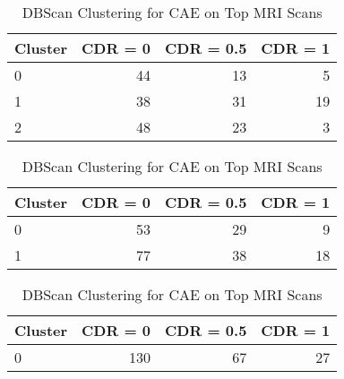 \begin{table}[h] \centering
\begin{minipage}{0.3\textwidth}

\begin{tabular}{lrrr}
\toprule
Cluster & CDR = 0 & CDR = 0.5 & CDR = 1\\
\midrule
0 & 44 & 13 & 5\\
1 & 38 & 31 & 19\\
2 & 48 & 23 & 3\\
\bottomrule
\end{tabular}
\caption{Kmeans Clustering with 3 Clusters for CAE on Top MRI Scans}
\end{minipage}
\hspace{3cm}
\begin{minipage}{0.3\textwidth}

\begin{tabular}{lrrr}
\toprule
Cluster & CDR = 0 & CDR = 0.5 & CDR = 1\\
\midrule
0 & 53 & 29 & 9\\
1 & 77 & 38 & 18\\
\bottomrule
\end{tabular}
\caption{Kmeans Clustering with 2 Clusters for CAE on Top MRI Scans}
\end{minipage}
\hspace{3cm}
\begin{minipage}{0.3\textwidth}

\begin{tabular}{lrrr}
\toprule
Cluster & CDR = 0 & CDR = 0.5 & CDR = 1\\
\midrule
0 & 130 & 67 & 27\\
\bottomrule
\end{tabular}
\caption{DBScan Clustering for CAE on Top MRI Scans}
\end{minipage}
\end{table}
